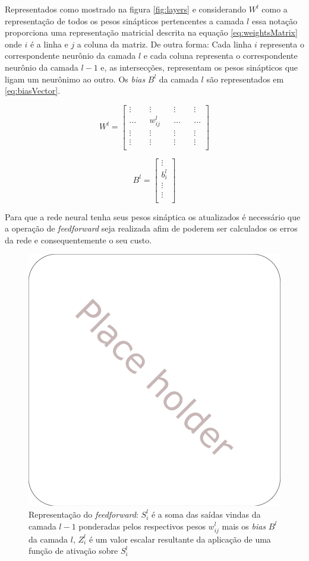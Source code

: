 \begin{apendicesenv}
	\par Representados como mostrado na figura \ref{fig:layers} e considerando $W^l$ como a representação de todos os pesos sinápticos pertencentes a camada $l$ essa notação proporciona uma representação matricial descrita na equação \ref{eq:weightsMatrix} onde $i$ é a linha e $j$ a coluna da matriz. De outra forma: Cada linha $i$ representa o correspondente neurônio da camada $l$ e cada coluna representa o correspondente neurônio da camada $l-1$ e, as intersecções, representam os pesos sinápticos que ligam um neurônimo ao outro. Os \textit{bias} $B^l$ da camada $l$ são representados em \ref{eq:biasVector}. 
	
	\begin{equation}\label{eq:weightsMatrix}
		W^l = \begin{bmatrix}
			\vdots && \vdots && \vdots && \vdots \\
			\hdots && w^l_{ij} && \hdots && \hdots \\
			\vdots && \vdots && \vdots && \vdots \\
			\vdots && \vdots && \vdots && \vdots \\
		\end{bmatrix}
	\end{equation}

	\begin{equation}\label{eq:biasVector}
		B^l = \begin{bmatrix}
			\vdots \\
			b^l_i  \\
			\vdots \\
			\vdots \\
		\end{bmatrix}
	\end{equation}

	\par Para que a rede neural tenha seus pesos sináptica os atualizados é necessário que a operação de \textit{feedforward} seja realizada afim de poderem ser calculados os erros da rede e consequentemente o seu custo.
	
	\begin{figure}[H]
		\centering
		\caption{Representação do \textit{feedforward}: $S^l_i$ é a soma das saídas vindas da camada $l-1$ ponderadas pelos respectivos pesos $ w^l_{ij}$ mais os \textit{bias} $B^l$ da camada $l$, $Z^l_i$ é um valor escalar resultante da aplicação de uma função de ativação sobre $S^l_i$}
		\label{fig:layersFeedforward}
		\includegraphics[width=0.5\linewidth]{images/placeholder}
	\end{figure}


\end{apendicesenv}
